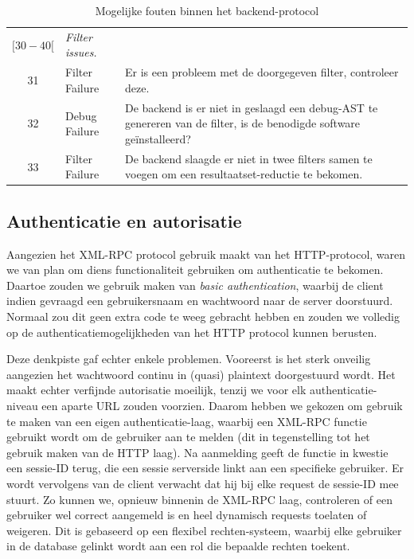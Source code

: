 \begin{table}
\begin{tabular}{| c p{4cm} p{7cm} |}
	$[30-40[$ & \emph{Filter issues.} & \\
	31 & Filter Failure & Er is een probleem met de doorgegeven filter, controleer deze. \\
	32 & Debug Failure & De backend is er niet in geslaagd een debug-AST te genereren van de filter, is de benodigde software ge\"installeerd? \\
	33 & Filter Failure & De backend slaagde er niet in twee filters samen te voegen om een resultaatset-reductie te bekomen. \\
	
	\hline
\end{tabular}
\caption{Mogelijke fouten binnen het backend-protocol}
\label{tbl:real:xmlrpc:fouten}
\end{table}

\subsection{Authenticatie en autorisatie}

Aangezien het XML-RPC protocol gebruik maakt van het HTTP-protocol, waren we van plan om diens functionaliteit gebruiken om authenticatie te bekomen. Daartoe zouden we gebruik maken van \emph{basic authentication}, waarbij de client indien gevraagd een gebruikersnaam en wachtwoord naar de server doorstuurd. Normaal zou dit geen extra code te weeg gebracht hebben en zouden we volledig op de authenticatiemogelijkheden van het HTTP protocol kunnen berusten.

Deze denkpiste gaf echter enkele problemen. Vooreerst is het sterk onveilig aangezien het wachtwoord continu in (quasi) plaintext doorgestuurd wordt. Het maakt echter verfijnde autorisatie moeilijk, tenzij we voor elk authenticatie-niveau een aparte URL zouden voorzien. Daarom hebben we gekozen om gebruik te maken van een eigen authenticatie-laag, waarbij een XML-RPC functie gebruikt wordt om de gebruiker aan te melden (dit in tegenstelling tot het gebruik maken van de HTTP laag). Na aanmelding geeft de functie in kwestie een sessie-ID terug, die een sessie serverside linkt aan een specifieke gebruiker. Er wordt vervolgens van de client verwacht dat hij bij elke request de sessie-ID mee stuurt. Zo kunnen we, opnieuw binnenin de XML-RPC laag, controleren of een gebruiker wel correct aangemeld is en heel dynamisch requests toelaten of weigeren. Dit is gebaseerd op een flexibel rechten-systeem, waarbij elke gebruiker in de database gelinkt wordt aan een rol die bepaalde rechten toekent.

